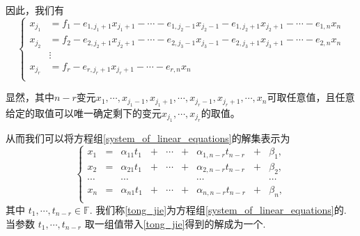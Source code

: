 \begin{frame}
因此，我们有
\begin{equation*}
\left\{
\begin{array}{ll}
x_{j_1} &=f_1 -e_{1,j_1+1}x_{j_1+1}-\cdots-e_{1,j_2-1}x_{j_2-1}-e_{1,j_2+1}x_{j_2+1}-\cdots-e_{1,n}x_{n}\\
x_{j_2} &=f_2 -e_{2,j_2+1}x_{j_2+1}-\cdots-e_{2,j_3-1}x_{j_3-1}-e_{2,j_3+1}x_{j_3+1}-\cdots-e_{2,n}x_{n}\\
&\vdots\\
x_{j_r} &=f_r -e_{r,j_r+1}x_{j_r+1}-\cdots-e_{r,n}x_{n}\\
\end{array}
\right.
\end{equation*}
\pp
\bigskip

显然，其中$n-r$变元$x_{1},\cdots,x_{j_1-1},x_{j_1+1},\cdots,x_{j_r-1},x_{j_r+1},\cdots,x_n$可取任意值，且任意给定的取值可以唯一确定剩下的变元$x_{j_1},\cdots,x_{j_r}$的取值。
\pp
\bigskip

从而我们可以将方程组\eqref{system_of_linear_equations}的解集表示为
\begin{equation}\label{tong_jie}\tag{$**$}
\left\{
\begin{array}{ccccccccc}
x_1 &=& \alpha_{11}t_1 &+& \cdots &+& \alpha_{1,n-r}t_{n-r} &+& \beta_1,\\
x_2 &=& \alpha_{21}t_1 &+& \cdots &+& \alpha_{2,n-r}t_{n-r} &+& \beta_2,\\
\cdots  && \cdots &&&&\cdots && \cdots\\
x_n &=& \alpha_{n1}t_1 &+& \cdots &+& \alpha_{n,n-r}t_{n-r} &+& \beta_n,\\
\end{array}\right.
\end{equation}
其中 $t_1,\cdots,t_{n-r}\in \mathbb F$. \pp  我们称\eqref{tong_jie}为方程组\eqref{system_of_linear_equations}的. \pp 当参数 $t_1,\cdots,t_{n-r}$ 取一组值带入\eqref{tong_jie}得到的解成为一个.

\end{frame}





